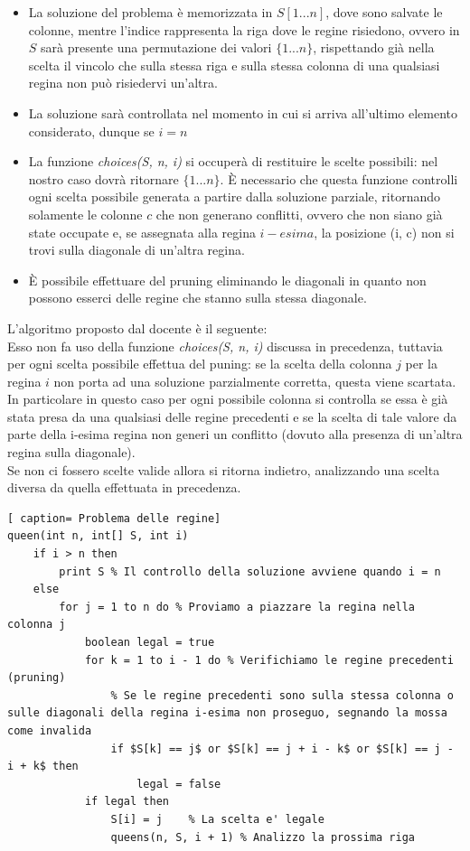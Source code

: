 \documentclass[../cheatSheetAlgoritmi.tex]{subfiles}
\begin{document}
\begin{itemize}
	\item La soluzione del problema è memorizzata in $S[1 ... n]$, dove sono salvate le colonne, mentre l'indice rappresenta la riga dove le regine risiedono, ovvero in $S$ sarà presente una permutazione dei valori $\{1 ... n\}$, rispettando già nella scelta il vincolo che sulla stessa riga e sulla stessa colonna di una qualsiasi regina non può risiedervi un'altra.
	\item La soluzione sarà controllata nel momento in cui si arriva all'ultimo elemento considerato, dunque se $i = n$
	\item La funzione \emph{choices(S, n, i)} si occuperà di restituire le scelte possibili: nel nostro caso dovrà ritornare $\{1 ... n\}$. È necessario che questa funzione controlli ogni scelta possibile generata a partire dalla soluzione parziale, ritornando solamente le colonne $c$ che non generano conflitti, ovvero che non siano già state occupate e, se assegnata alla regina $i-esima$, la posizione (i, c) non si trovi sulla diagonale di un'altra regina.
	\item È possibile effettuare del pruning eliminando le diagonali in quanto non possono esserci delle regine che stanno sulla stessa diagonale.
\end{itemize}
L'algoritmo proposto dal docente è il seguente: \\
Esso non fa uso della funzione \emph{choices(S, n, i)} discussa in precedenza, tuttavia per ogni scelta possibile effettua del puning: se la scelta della colonna $j$ per la regina $i$ non porta ad una soluzione parzialmente corretta, questa viene scartata. \\
In particolare in questo caso per ogni possibile colonna si controlla se essa è già stata presa da una qualsiasi delle regine precedenti e se la scelta di tale valore da parte della i-esima regina non generi un conflitto (dovuto alla presenza di un'altra regina sulla diagonale). \\
Se non ci fossero scelte valide allora si ritorna indietro, analizzando una scelta diversa da quella effettuata in precedenza.
 \begin{lstlisting}[ caption= Problema delle regine]
queen(int n, int[] S, int i)
	if i > n then
		print S % Il controllo della soluzione avviene quando i = n
	else 
		for j = 1 to n do % Proviamo a piazzare la regina nella colonna j
			boolean legal = true
			for k = 1 to i - 1 do % Verifichiamo le regine precedenti (pruning)
				% Se le regine precedenti sono sulla stessa colonna o sulle diagonali della regina i-esima non proseguo, segnando la mossa come invalida
				if $S[k] == j$ or $S[k] == j + i - k$ or $S[k] == j -  i + k$ then
					legal = false 
			if legal then
				S[i] = j	% La scelta e' legale
				queens(n, S, i + 1) % Analizzo la prossima riga
\end{lstlisting}
\end{document}
